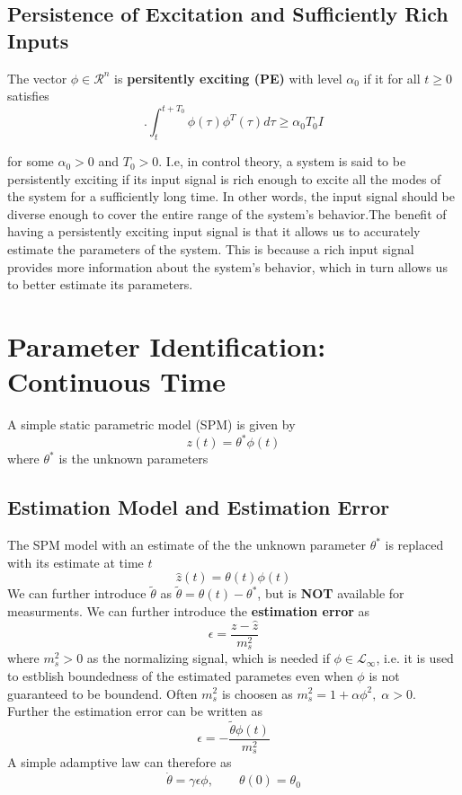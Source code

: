 \documentclass[10pt]{article}
\begin{document}
\begin{multicols*}{2}
\subsection{Persistence of Excitation and Sufficiently Rich Inputs}
The vector $\phi \in \mathcal{R}^n$ is \textbf{persitently exciting (PE)} with level $\alpha_0$ if it for all $t \geq 0$ satisfies
\begin{equation*}.
    \int_{t}^{t+T_0}\phi(\tau)\phi^T(\tau)d\tau \geq \alpha_0 T_0 I
\end{equation*}

for some $\alpha_0 > 0$ and \(T_0 > 0\). I.e, in control theory, a system is said to be persistently exciting if its input signal is rich enough to excite all the modes of the system for a sufficiently long time. In other words, the input signal should be diverse enough to cover the entire range of the system's behavior.The benefit of having a persistently exciting input signal is that it allows us to accurately estimate the parameters of the system. This is because a rich input signal provides more information about the system's behavior, which in turn allows us to better estimate its parameters.
\section{Parameter Identification: Continuous Time}
A simple static parametric model (SPM) is given by
\begin{equation}
    z(t) = \theta^{*}\phi(t)
\end{equation}
where $\theta^{*}$ is the unknown parameters
\subsection{Estimation Model and Estimation Error}
The SPM model with an estimate of the the unknown parameter $\theta^{*}$ is replaced with its estimate at time $t$
\begin{equation}
    \hat{z}(t) = \theta(t)\phi(t)
\end{equation}
We can further introduce $\tilde{\theta}$ as $\tilde{\theta}=\theta(t)-\theta^*$, but is \textbf{NOT} available for measurments. We can further introduce the \textbf{estimation error} as
\begin{equation}
    \epsilon = \frac{z - \hat{z}}{m_s ^2}
\end{equation}
where $m_s^2 > 0$ as the normalizing signal, which is needed if $\phi \in \mathcal{L}_{\infty}$, i.e. it is used to estblish boundedness of the estimated parametes even when $\phi$ is not guaranteed to be boundend. Often $m_s^2$ is choosen as $m_s^2=1+\alpha \phi^2, \; \alpha > 0$. Further the estimation error can be written as
\begin{equation}
    \epsilon = - \frac{\tilde{\theta}\phi(t)}{m_s ^2}
\end{equation}
A simple adamptive law can therefore as
\begin{equation}
    \dot \theta = \gamma \epsilon \phi, \qquad \theta(0) = \theta_0
\end{equation}

\end{multicols*}
\end{document}
